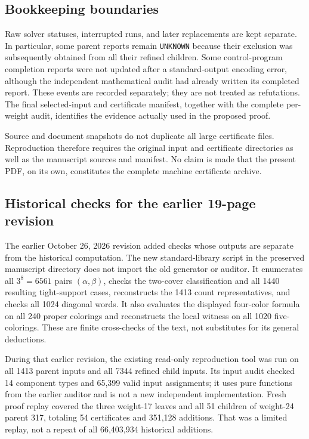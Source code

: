 \subsection{Bookkeeping boundaries}
Raw solver statuses, interrupted runs, and later replacements are kept
separate. In particular, some parent reports remain \texttt{UNKNOWN}
because their exclusion was subsequently obtained from all their refined
children. Some control-program completion reports were not updated after
a standard-output encoding error, although the independent mathematical
audit had already written its completed report. These events are recorded
separately; they are not treated as refutations. The final selected-input
and certificate manifest, together with the complete per-weight audit,
identifies the evidence actually used in the proposed proof.

Source and document snapshots do not duplicate all large certificate
files. Reproduction therefore requires the original input and certificate
directories as well as the manuscript sources and manifest. No claim is
made that the present PDF, on its own, constitutes the complete machine
certificate archive.


\subsection{Historical checks for the earlier 19-page revision}
The earlier October 26, 2026 revision added checks whose outputs are separate from
the historical computation. The new standard-library script
 in the preserved
 manuscript directory does not
import the old generator or auditor. It enumerates all $3^8=6561$ pairs
$(\alpha,\beta)$, checks the two-cover classification and all 1440
resulting tight-support cases, reconstructs the 1413 count representatives,
and checks all 1024 diagonal words. It also evaluates the displayed
four-color formula on all 240 proper colorings and reconstructs the
local witness on all 1020 five-colorings. These are finite cross-checks
of the text, not substitutes for its general deductions.

During that earlier revision, the existing read-only reproduction tool was run on all 1413 parent
inputs and all 7344 refined child inputs. Its input audit checked 14
component types and 65,399 valid input assignments; it uses pure
functions from the earlier auditor and is not a new independent
implementation. Fresh proof replay covered the three weight-17 leaves
and all 51 children of weight-24 parent 317, totaling 54 certificates
and 351,128 additions. That was a limited replay, not a repeat of all
66,403,934 historical additions.

